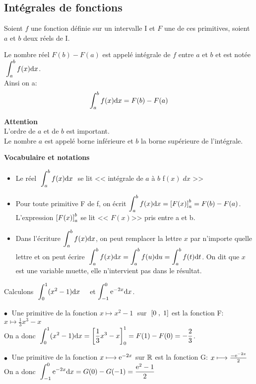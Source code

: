 \subsection{Intégrales de fonctions}
\begin{definition}
Soient $ f $ une fonction définie sur un intervalle I et $  F $ une de ces primitives, soient $ a $ et $ b $ deux réels   de I.

Le nombre réel $ F(b)-F(a) $ est appelé intégrale de $ f $ entre $ a $ et $ b $ et est notée   $\; \displaystyle\int_{a}^{b}f(x){\rm d}x $. 
\\ Ainsi on a:
$$ \displaystyle\int_{a}^{b}f(x){\rm d}x =F(b)-F(a) $$

\end{definition}
 \textbf{Attention}\\
L'ordre de $a$ et de $b$ est important.\\
Le nombre $a$ est appelé borne inférieure et $b$ la borne supérieure de l'intégrale.
\medskip
 
 \textbf{Vocabulaire  et notations}
 \begin{itemize}
 \item Le réel  $\; \displaystyle\int_{a}^{b}f(x){\rm d}x\;  $ \; se lit  <<  intégrale  de $a$  à $b$  \;f$(x)\; dx$  >>
\item Pour toute primitive F de f, on écrit \;   $ \displaystyle\int_{a}^{b}f(x){\rm d}x=\left[ F(x) \right]^{b}_{a} =F(b)-F(a) $.\\
L'expression \;$ \left[ F(x) \right]^{b}_{a} $\; se lit <<  $ F(x) $>>  pris entre a et b.
\item  Dans l'écriture  $ \displaystyle\int_{a}^{b}f(x){\rm d}x $, on peut remplacer la lettre $ x $ par n'importe quelle    lettre  et on peut écrire   $ \;\displaystyle\int_{a}^{b}f(x){\rm d}x  =  \displaystyle\int_{a}^{b}f(u){\rm d}u =  \displaystyle\int_{a}^{b}f(t){\rm d}t $.\; On dit que $ x $ est une variable muette,  elle n'intervient pas dans le résultat.
  \end{itemize}
  
  \medskip
  \begin{example}
  
Calculons $\;  \displaystyle\int_{0}^{1}(x^{2}-1){\rm d}x \quad$   et  \quad$\displaystyle\int_{-1}^{0}\mathrm{e}^{-2x}{\rm d}x  $.
 
  \bigskip
$ \bullet \; $   Une primitive de la fonction  $ x\longmapsto x^{2}-1 \; $  sur $\;  \left[0\;,\; 1\right] $ est la fonction  F: $ x\longmapsto \frac{1}{3}x^{3}-x $\\ On a donc  $\;  \displaystyle\int_{0}^{1}(x^{2}-1){\rm d}x= \left[ \frac{1}{3}x^{3}- x \right]^{1}_{0}=F(1)-F(0) =-\frac{2}{3}$.

\medskip

$ \bullet \; $   Une primitive de la fonction  $ x\longmapsto \mathrm{e}^{-2x}$  sur $ \mathbb{R} $ est la fonction  G: $ x\longmapsto  \frac{-\mathrm{e}^{-2x}}{2} $\\


On a donc  $\;  \displaystyle\int_{-1}^{0}\mathrm{e}^{-2x}{\rm d}x=G(0)-G(-1)= \frac{\mathrm{e}^{2} -1}{2}$
\end{example}
 

